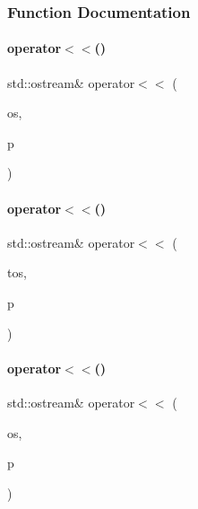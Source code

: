 \subsubsection{Function Documentation}
\mbox{\label{_parts_8cpp_a545350ed97c61e94aefe4fff919dd749}} 
\paragraph{\texorpdfstring{operator$<$$<$()}{operator<<()}\hspace{0.1cm}{\footnotesize\ttfamily [1/20]}}
{\footnotesize\ttfamily std\+::ostream\& operator$<$$<$ (\begin{DoxyParamCaption}\item[{std\+::ostream \&}]{os,  }\item[{const \mbox{\hyperlink{class_part}{Part}} \&}]{p }\end{DoxyParamCaption})}

\mbox{\label{_parts_8cpp_adbf3d6a04840d73851e882509f7a9ac7}} 
\paragraph{\texorpdfstring{operator$<$$<$()}{operator<<()}\hspace{0.1cm}{\footnotesize\ttfamily [2/20]}}
{\footnotesize\ttfamily std\+::ostream\& operator$<$$<$ (\begin{DoxyParamCaption}\item[{\mbox{\hyperlink{structutos__ostream}{utos\+\_\+ostream}}}]{tos,  }\item[{const \mbox{\hyperlink{class_part}{Part}} \&}]{p }\end{DoxyParamCaption})}

\mbox{\label{_parts_8cpp_a4e72844a8f5f9e999222fcd2ce889cc6}} 
\paragraph{\texorpdfstring{operator$<$$<$()}{operator<<()}\hspace{0.1cm}{\footnotesize\ttfamily [3/20]}}
{\footnotesize\ttfamily std\+::ostream\& operator$<$$<$ (\begin{DoxyParamCaption}\item[{std\+::ostream \&}]{os,  }\item[{const \mbox{\hyperlink{class_c_p_u}{C\+PU}} \&}]{p }\end{DoxyParamCaption})}


